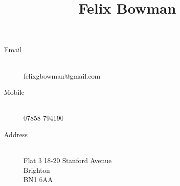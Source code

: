 \documentclass[10pt]{article}
\title{\vspace{-12ex}\sffamily\bfseries\huge Felix Bowman \vspace{-6ex}}
\date{}
\begin{document}
\begin{minipage}{0.74\textwidth}
\begingroup
\let\center\flushleft
\let\endcenter\endflushleft
\maketitle
\endgroup
\end{minipage}

\noindent\makebox[\linewidth]{\rule{\textwidth}{0.4pt}}

\vspace{1em}
\begin{minipage}[ht]{0.48\textwidth}
    \begin{description}
        \item[Email] \hfill \\
            felixgbowman@gmail.com
        \item[Mobile] \hfill \\
            07858 794190
    \end{description}
\end{minipage}
\begin{minipage}[ht]{0.48\textwidth}
    \begin{description}
        \item[Address] \hfill \\
            Flat 3 
            18-20 Stanford Avenue \\
            Brighton \\
            BN1 6AA \\
    \end{description}
\end{minipage}
\end{document}
